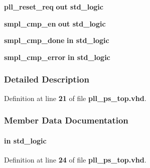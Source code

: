 \begin{DoxyCompactItemize}
\item 
{\bf pll\+\_\+reset\+\_\+req}  {\bfseries {\bfseries \textcolor{keywordflow}{out}\textcolor{vhdlchar}{ }}} {\bfseries \textcolor{comment}{std\+\_\+logic}\textcolor{vhdlchar}{ }} 
\item 
{\bf smpl\+\_\+cmp\+\_\+en}  {\bfseries {\bfseries \textcolor{keywordflow}{out}\textcolor{vhdlchar}{ }}} {\bfseries \textcolor{comment}{std\+\_\+logic}\textcolor{vhdlchar}{ }} 
\item 
{\bf smpl\+\_\+cmp\+\_\+done}  {\bfseries {\bfseries \textcolor{keywordflow}{in}\textcolor{vhdlchar}{ }}} {\bfseries \textcolor{comment}{std\+\_\+logic}\textcolor{vhdlchar}{ }} 
\item 
{\bf smpl\+\_\+cmp\+\_\+error}  {\bfseries {\bfseries \textcolor{keywordflow}{in}\textcolor{vhdlchar}{ }}} {\bfseries \textcolor{comment}{std\+\_\+logic}\textcolor{vhdlchar}{ }} 
\end{DoxyCompactItemize}


\subsubsection{Detailed Description}


Definition at line {\bf 21} of file {\bf pll\+\_\+ps\+\_\+top.\+vhd}.



\subsubsection{Member Data Documentation}
\paragraph[{clk}]{ {\bfseries \textcolor{keywordflow}{in}\textcolor{vhdlchar}{ }} {\bfseries \textcolor{comment}{std\+\_\+logic}\textcolor{vhdlchar}{ }} \hspace{0.3cm}{\ttfamily [Port]}}\label{classpll__ps__top_a4a4609c199d30b3adebbeb3a01276ec5}


Definition at line {\bf 24} of file {\bf pll\+\_\+ps\+\_\+top.\+vhd}.

\paragraph[{ieee}]{\hspace{0.3cm}{\ttfamily [Library]}}\label{classpll__ps__top_a0a6af6eef40212dbaf130d57ce711256}



